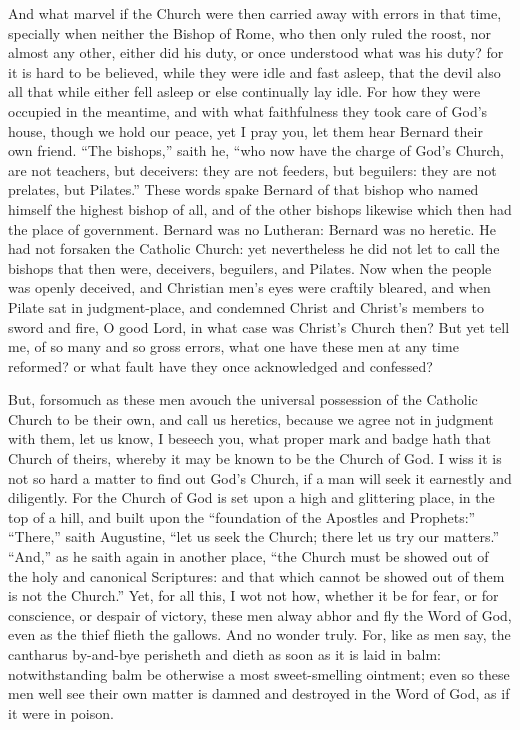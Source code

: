 And what marvel if the Church were then carried away with errors
in that time, specially when neither the Bishop of Rome, who then only
ruled the roost, nor almost any other, either did his duty, or once
understood what was his duty? for it is hard to be believed, while they
were idle and fast asleep, that the devil also all that while either
fell asleep or else continually lay idle. For how they were occupied
in the meantime, and with what faithfulness they took care of God’s
house, though we hold our peace, yet I pray you, let them hear Bernard
their own friend. “The bishops,” saith he, “who
now have the charge of God’s Church, are not teachers, but deceivers:
they are not feeders, but beguilers: they are not prelates, but Pilates.”
These words spake
Bernard of that bishop who named himself the highest bishop of all,
and of the other bishops likewise which then had the place of government.
Bernard was no Lutheran: Bernard was no heretic. He had not forsaken
the Catholic Church: yet nevertheless he did not let to call the bishops
that then were, deceivers, beguilers, and Pilates. Now when the
people was openly deceived, and Christian men’s eyes were craftily
bleared, and when Pilate sat in judgment-place, and condemned Christ
and Christ’s members to sword and fire, O good Lord, in what case
was Christ’s Church then? But yet tell me, of so many and
so gross errors, what one have these men at any time reformed? or what
fault have they once acknowledged and confessed?

But, forsomuch as these men avouch the universal possession of the
Catholic Church to be their own, and call us heretics, because we agree
not in judgment with them, let us know, I beseech you, what proper mark
and badge hath that Church of theirs, whereby it may be known to be
the Church of God. I wiss it is not so hard a matter to find out
God’s Church, if a man will seek it earnestly and diligently.
For the Church of God is set upon a high and glittering place, in the
top of a hill, and built upon the “foundation of the Apostles
and
Prophets:” “There,” saith Augustine, “let us
seek the Church; there let us try our matters.” “And,”
as he saith again in another place, “the Church must be showed
out of the holy and canonical Scriptures: and that which cannot be showed
out of them is not the Church.” Yet, for all this, I wot
not how, whether it be for fear, or for conscience, or despair of victory,
these men alway abhor and fly the Word of God, even as the thief flieth
the gallows. And no wonder truly. For, like as men say,
the cantharus by-and-bye perisheth and dieth as soon as it is laid in
balm: notwithstanding balm be otherwise a most sweet-smelling ointment;
even so these men well see their own matter is damned and destroyed
in the Word of God, as if it were in poison.

